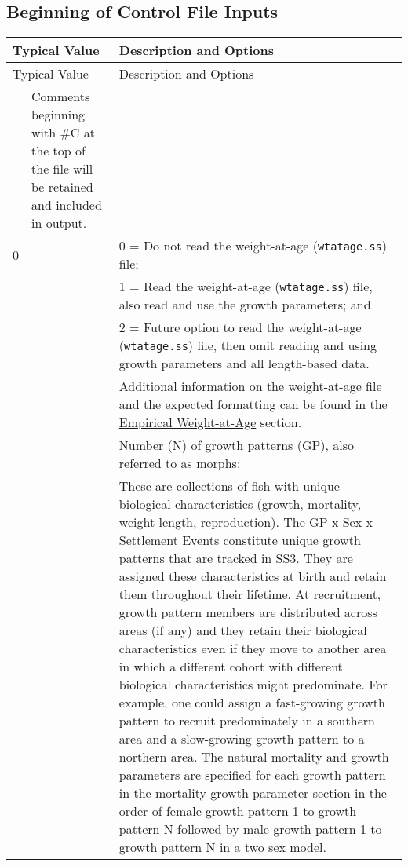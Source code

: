 \subsection{Beginning of Control File Inputs}
\begin{center}
	\begin{longtable}{p{0.5cm} p{2cm} p{12.5cm}}
		\hline
		\multicolumn{2}{l}{Typical Value} & Description and Options \Tstrut\Bstrut\\
		\hline
		\endfirsthead

		\hline
		\multicolumn{2}{l}{Typical Value} & Description and Options \Tstrut\Bstrut\\
		\hline
		\endhead

		\hline
		\endfoot

		\endlastfoot

		\multicolumn{2}{l}{\#C comment} \Tstrut & Comments beginning with \#C at the top of the file will be retained and included in output. \Bstrut\\
		\hline

		0 & & 0 = Do not read the weight-at-age (\verb|wtatage.ss|) file; \Tstrut\\
		  & & 1 = Read the weight-at-age (\verb|wtatage.ss|) file, also read and use the growth parameters; and \\
		  & & 2 = Future option to read the weight-at-age (\verb|wtatage.ss|) file, then omit reading and using growth parameters and all length-based data. \\
		  & & Additional information on the weight-at-age file and the expected formatting can be found in the \hyperlink{WAA}{Empirical Weight-at-Age} section. \Bstrut\\

		\pagebreak
		1 & & Number (N) of growth patterns (GP), also referred to as morphs: \Tstrut\\
		& & These are collections of fish with unique biological characteristics (growth, mortality, weight-length, reproduction). The GP x Sex x Settlement Events constitute unique growth patterns that are tracked in SS3. They are assigned these characteristics at birth and retain them throughout their lifetime. At recruitment, growth pattern members are distributed across areas (if any) and they retain their biological characteristics even if they move to another area in which a different cohort with different biological characteristics might predominate. For example, one could assign a fast-growing growth pattern to recruit predominately in a southern area and a slow-growing growth pattern to a northern area. The natural mortality and growth parameters are specified for each growth pattern in the mortality-growth parameter section in the order of female growth pattern 1 to growth pattern N followed by male growth pattern 1 to growth pattern N in a two sex model. \Bstrut\\


\end{longtable}
\end{center}
